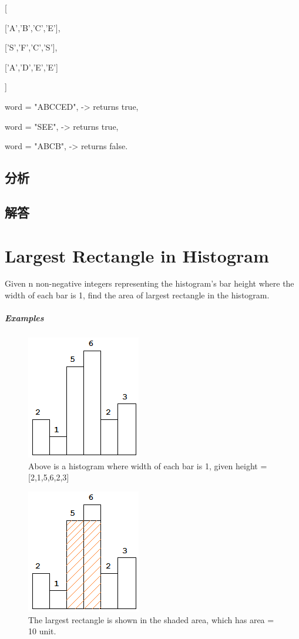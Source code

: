 \documentclass[UTF8,a4paper,12pt]{ctexbook}
\begin{document}
		[
		
		['A','B','C','E'],
		
		['S','F','C','S'],
		
		['A','D','E','E']
		
		]
		
		word = "ABCCED", -> returns true,
		
		word = "SEE", -> returns true,
		
		word = "ABCB", -> returns false.
	\subsection{分析}
	
	\subsection{解答}
	
	
\section{Largest Rectangle in Histogram}
		Given n non-negative integers representing the histogram's bar height where the width of each bar is 1, find the area of largest rectangle in the histogram.
			
	\subparagraph{Examples}
		\begin{figure}[h]
			\centering
			\includegraphics[scale = 0.7]{LargestH_1.png}
			\caption{Above is a histogram where width of each bar is 1, given height = [2,1,5,6,2,3]}
		\end{figure}
		\begin{figure}[h]
			\centering
			\includegraphics[scale = 0.7]{LargestH_2.png}
			\caption{The largest rectangle is shown in the shaded area, which has area = 10 unit.}
		\end{figure}
		
\end{document}
